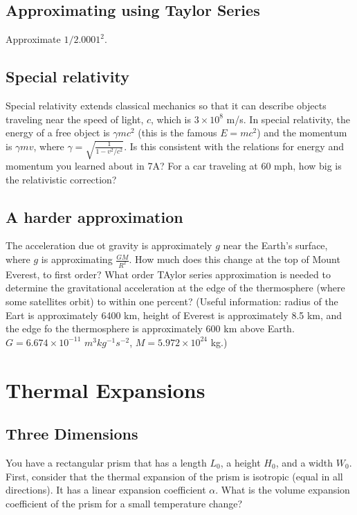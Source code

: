 \documentclass{article}
\begin{document}
\subsection{Approximating using Taylor Series}

Approximate $1/2.0001^2$.

\subsection{Special relativity}

Special relativity extends classical mechanics so that it can describe objects traveling near the speed of light, $c$, which is $3\times10^8$ m/s. In special relativity, the energy of a free object is $\gamma mc^2$ (this is the famous $E=mc^2$) and the momentum is $\gamma mv$, where $\gamma = \sqrt{\frac{1}{1-v^2/c^2}}$. Is this consistent with the relations for energy and momentum you learned about in 7A? For a car traveling at 60 mph, how big is the relativistic correction?

\subsection{A harder approximation}

The acceleration due ot gravity is approximately $g$ near the Earth's surface, where $g$ is approximating $\frac{GM}{R^2}$. How much does this change at the top of Mount Everest, to first order? What order TAylor series approximation is needed to determine the gravitational acceleration at the edge of the thermosphere (where some satellites orbit) to within one percent? (Useful information: radius of the Eart is approximately 6400 km, height of Everest is approximately 8.5 km, and the edge fo the thermosphere is approximately 600 km above Earth. $G=6.674\times10^{-11}$ $m^3 kg^{-1} s^{-2}$, $M=5.972\times10^{24}$ kg.)

\newpage

\section{Thermal Expansions}

\subsection{Three Dimensions}

You have a rectangular prism that has a length $L_0$, a height $H_0$, and a width $W_0$. First, consider that the thermal expansion of the prism is isotropic (equal in all directions). It has a linear expansion coefficient $\alpha$. What is the volume expansion coefficient of the prism for a small temperature change?
\end{document}
